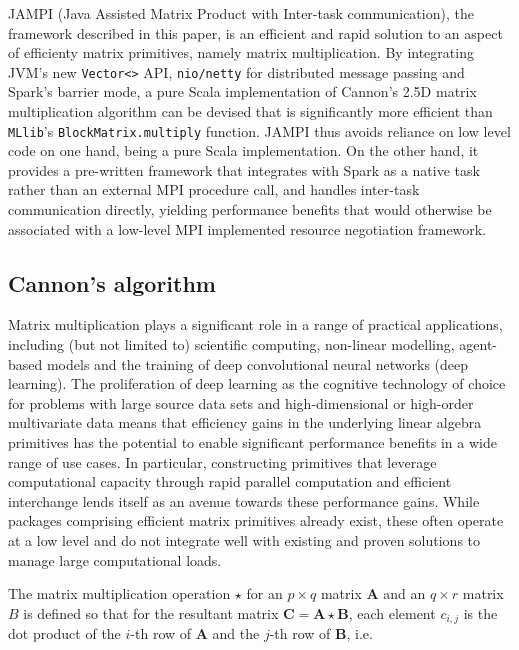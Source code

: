 \documentclass[fleqn,10pt]{SelfArx} %
\begin{document}
JAMPI (Java Assisted Matrix Product with Inter-task communication), the framework described in this paper, is an efficient and rapid solution to an aspect of efficienty matrix primitives, namely matrix multiplication. By integrating JVM's new \texttt{Vector<>} API, \texttt{nio/netty} for distributed message passing and Spark's barrier mode, a pure Scala implementation of Cannon's 2.5D matrix multiplication algorithm can be devised that is significantly more efficient than \texttt{MLlib}'s \texttt{BlockMatrix.multiply} function. JAMPI thus avoids reliance on low level code on one hand, being a pure Scala implementation. On the other hand, it provides a pre-written framework that integrates with Spark as a native task rather than an external MPI procedure call, and handles inter-task communication directly, yielding performance benefits that would otherwise be associated with a low-level MPI implemented resource negotiation framework.

\subsection{Cannon's algorithm} %
\label{sub:cannon_s_algorithm}

Matrix multiplication plays a significant role in a range of practical applications, including (but not limited to) scientific computing, non-linear modelling, agent-based models and the training of deep convolutional neural networks (deep learning). The proliferation of deep learning as the cognitive technology of choice for problems with large source data sets and high-dimensional or high-order multivariate data means that efficiency gains in the underlying linear algebra primitives has the potential to enable significant performance benefits in a wide range of use cases. In particular, constructing primitives that leverage computational capacity through rapid parallel computation and efficient interchange lends itself as an avenue towards these performance gains. While packages comprising efficient matrix primitives already exist,\cite{chetlur2014cudnn} these often operate at a low level and do not integrate well with existing and proven solutions to manage large computational loads.


The matrix multiplication operation $\star$ for an $p \times q$ matrix $\mathbf{A}$ and an $q \times r$ matrix $B$ is defined so that for the resultant matrix $\mathbf{C} = \mathbf{A} \star \mathbf{B}$, each element $c_{i, j}$ is the dot product of the $i$-th row of $\mathbf{A}$ and the $j$-th row of $\mathbf{B}$, i.e.
\end{document}
